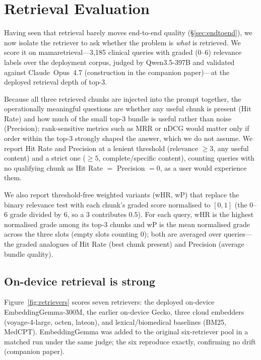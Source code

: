 \section{Retrieval Evaluation}
\label{sec:retrieval-results}

Having seen that retrieval barely moves end-to-end quality
(\S\ref{sec:endtoend}), we now isolate the retriever to ask whether the
problem is \emph{what} is retrieved. We score it on mamaretrieval---3{,}185
clinical queries with graded ($0$--$6$) relevance labels over the deployment
corpus, judged by Qwen3.5-397B and validated against Claude~Opus~4.7
(construction in the companion paper)---at the deployed retrieval depth of
top-3.

Because all three retrieved chunks are injected into the prompt together, the
operationally meaningful questions are whether any useful chunk is present
(Hit Rate) and how much of the small top-3 bundle is useful rather than noise
(Precision); rank-sensitive metrics such as MRR or nDCG would matter only if
order within the top-3 strongly shaped the answer, which we do not assume. We
report Hit Rate and Precision at a lenient threshold (relevance $\ge 3$, any
useful content) and a strict one ($\ge 5$, complete/specific content),
counting queries with no qualifying chunk as Hit Rate $=$ Precision $= 0$, as
a user would experience them.

We also report threshold-free weighted variants (wHR, wP) that replace the
binary relevance test with each chunk's graded score normalised to $[0,1]$
(the $0$--$6$ grade divided by $6$, so a $3$ contributes $0.5$). For each
query, wHR is the highest normalised grade among its top-3 chunks and wP is
the mean normalised grade across the three slots (empty slots counting $0$);
both are averaged over queries---the graded analogues of Hit Rate (best chunk
present) and Precision (average bundle quality).

\subsection{On-device retrieval is strong}

Figure~\ref{fig:retrievers} scores seven retrievers: the deployed on-device
EmbeddingGemma-300M, the earlier on-device Gecko, three cloud embedders
(voyage-4-large, octen, lateon), and lexical/biomedical baselines (BM25,
MedCPT). EmbeddingGemma was added to the original six-retriever pool in a
matched run under the same judge; the six reproduce exactly, confirming no
drift (companion paper).

